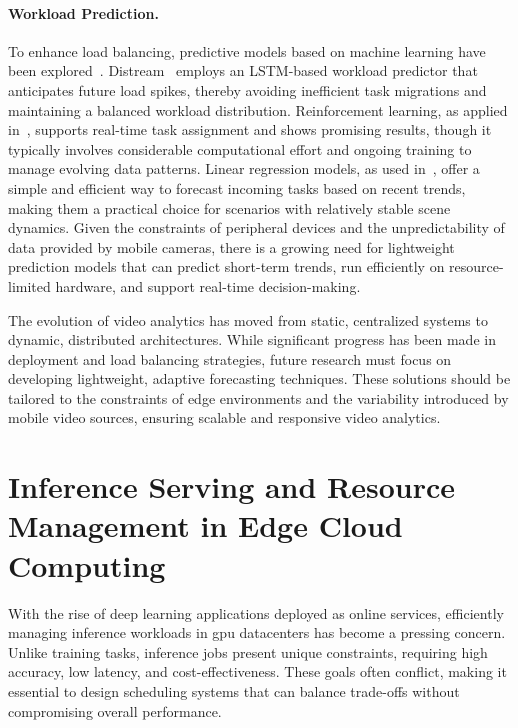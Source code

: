 \paragraph{Workload Prediction.}
To enhance load balancing, predictive models based on machine learning have been explored~\cite{zeng2020distream,yuan2021online,kombi2017preventive}.
Distream~\cite{zeng2020distream} employs an LSTM-based workload predictor that anticipates future load spikes, thereby avoiding inefficient task migrations and maintaining a balanced workload distribution.
Reinforcement learning, as applied in~\cite{yuan2021online}, supports real-time task assignment and shows promising results, though it typically involves considerable computational effort and ongoing training to manage evolving data patterns.
Linear regression models, as used in~\cite{kombi2017preventive}, offer a simple and efficient way to forecast incoming tasks based on recent trends, making them a practical choice for scenarios with relatively stable scene dynamics.
Given the constraints of peripheral devices and the unpredictability of data provided by mobile cameras, there is a growing need for lightweight prediction models that can predict short-term trends, run efficiently on resource-limited hardware, and support real-time decision-making.

The evolution of video analytics has moved from static, centralized systems to dynamic, distributed architectures. While significant progress has been made in deployment and load balancing strategies, future research must focus on developing lightweight, adaptive forecasting techniques. These solutions should be tailored to the constraints of edge environments and the variability introduced by mobile video sources, ensuring scalable and responsive video analytics.


\section{Inference Serving and Resource Management in Edge Cloud Computing}\label{sec:inference_serving_and_resource_management_in_edge_cloud_computing}

With the rise of deep learning applications deployed as online services, efficiently managing inference workloads in \acrshort{gpu} datacenters has become a pressing concern. Unlike training tasks, inference jobs present unique constraints, requiring high accuracy, low latency, and cost-effectiveness. These goals often conflict, making it essential to design scheduling systems that can balance trade-offs without compromising overall performance.

